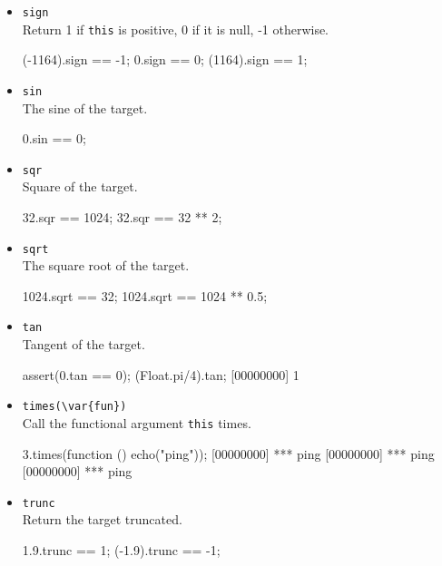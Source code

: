 \begin{itemize}
\item \lstinline|sign|\\
  Return 1 if \lstinline|this| is positive, 0 if it is null, -1
  otherwise.
\begin{urbiassert}[firstnumber=last]
(-1164).sign == -1;
0.sign       == 0;
(1164).sign  == 1;
\end{urbiassert}

\item \lstinline|sin|\\
  The sine of the target.
\begin{urbiassert}[firstnumber=last]
0.sin == 0;
\end{urbiassert}

\item \lstinline|sqr|\\
  Square of the target.
\begin{urbiassert}[firstnumber=last]
32.sqr == 1024;
32.sqr == 32 ** 2;
\end{urbiassert}

\item \lstinline|sqrt|\\
  The square root of the target.
\begin{urbiassert}[firstnumber=last]
1024.sqrt == 32;
1024.sqrt == 1024 ** 0.5;
\end{urbiassert}

\item \lstinline|tan|\\
  Tangent of the target.
\begin{urbiscript}[firstnumber=last]
assert(0.tan == 0);
(Float.pi/4).tan;
[00000000] 1
\end{urbiscript}

\item \lstinline|times(\var{fun})|\\
  Call the functional argument  \lstinline|this| times.

\begin{urbiscript}[firstnumber=last]
3.times(function () { echo("ping")});
[00000000] *** ping
[00000000] *** ping
[00000000] *** ping
\end{urbiscript}

\item \lstinline|trunc|\\
  Return the target truncated.
\begin{urbiassert}[firstnumber=last]
1.9.trunc == 1;
(-1.9).trunc == -1;
\end{urbiassert}


\end{itemize}
